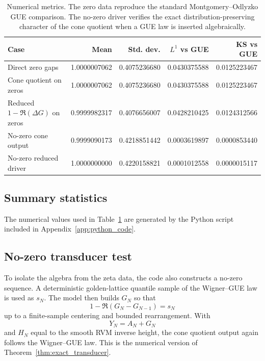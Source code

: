 \documentclass[11pt]{amsart}
\numberwithin{equation}{section}
\theoremstyle{plain}
\theoremstyle{definition}
\theoremstyle{remark}
\begin{document}
\begin{table}[htbp]
\centering
\small
\begin{tabular}{lrrrr}
\toprule
Case & Mean & Std. dev. & $L^1$ vs GUE & KS vs GUE\\
\midrule
Direct zero gaps & 1.0000007062 & 0.4075236680 & 0.0430375588 & 0.0125223467\\
Cone quotient on zeros & 1.0000007062 & 0.4075236680 & 0.0430375588 & 0.0125223467\\
Reduced $1-\Re(\Delta G)$ on zeros & 0.9999982317 & 0.4076656007 & 0.0428210425 & 0.0124312566\\
No-zero cone output & 0.9999090173 & 0.4218851442 & 0.0003619897 & 0.0000853440\\
No-zero reduced driver & 1.0000000000 & 0.4220158821 & 0.0001012558 & 0.0000015117\\
\bottomrule
\end{tabular}
\caption{Numerical metrics. The zero data reproduce the standard Montgomery--Odlyzko GUE comparison. The no-zero driver verifies the exact distribution-preserving character of the cone quotient when a GUE law is inserted algebraically.}
\label{tab:numerical_metrics}
\end{table}

\subsection{Summary statistics}
\label{subsec:summary_statistics}

The numerical values used in Table~\ref{tab:numerical_metrics} are generated by the Python script included in Appendix~\ref{app:python_code}.

\subsection{No-zero transducer test}
\label{subsec:no_zero_test}

To isolate the algebra from the zeta data, the code also constructs a no-zero sequence. A deterministic golden-lattice quantile sample of the Wigner--GUE law is used as $s_N$. The model then builds $G_N$ so that
\begin{equation}
1-\Re(G_N-G_{N-1})=s_N
\label{eq:no_zero_driver}
\end{equation}
up to a finite-sample centering and bounded rearrangement. With
\begin{equation}
Y_N=A_N+G_N
\label{eq:no_zero_y}
\end{equation}
and $H_N$ equal to the smooth RVM inverse height, the cone quotient output again follows the Wigner--GUE law. This is the numerical version of Theorem~\ref{thm:exact_transducer}.
\end{document}
